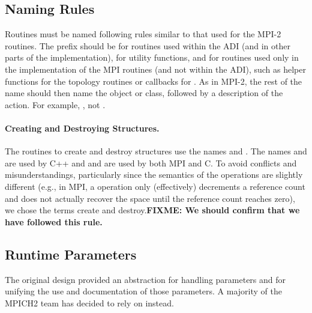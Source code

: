 \documentclass{article}
\def\fixme#1{\marginpar{FIXME:}\textbf{FIXME: #1}}
\begin{document}
\subsection{Naming Rules}
Routines must be named following rules similar to that used for the
MPI-2 routines.  The prefix should be  for routines used
within the ADI (and in other parts of the implementation),
 for utility functions, and  for routines used
only in the implementation of the MPI routines (and not within the
ADI), such as helper functions for the topology routines or callbacks
for .  As in MPI-2, the rest of the name should
then name the object or class, followed by a description of the
action.  For example, , not
. 

\paragraph{Creating and Destroying Structures.}
The routines to create and destroy structures use the names
 and 
.  The names  and  are used by
C++ and  and  are used by both MPI and C. 
To avoid conflicts and misunderstandings, particularly since the
semantics of the operations are slightly different (e.g., in MPI, a
 operation only (effectively) decrements a reference count
and does not actually recover the space until the reference count
reaches zero), we chose the terms create and destroy.\fixme{We should
  confirm that we have followed this rule.}

\subsection{Runtime Parameters}
\label{sec:runtime-params}
The original design provided an abstraction for handling parameters
and for unifying the use and documentation of those parameters.  A
majority of the MPICH2 team has decided to rely on 
instead.

\end{document}
